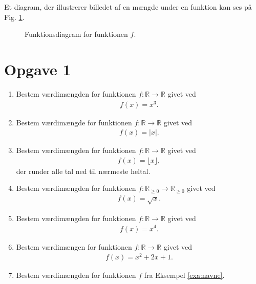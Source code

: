 Et diagram, der illustrerer billedet af en mængde under en funktion kan ses på Fig. \ref{fig:im}.
\begin{figure}[H]
	\centering
	\caption{Funktionsdiagram for funktionen $f$.}
	\label{fig:im}
\end{figure}


\section*{Opgave 1}
\begin{enumerate}[label=\roman*)]
\item Bestem værdimængden for funktionen $f:\mathbb{R} \to \mathbb{R}$ givet ved
\begin{align*}
f(x) = x^3.
\end{align*}
\item Bestem værdimængde for funktionen $f:\mathbb{R} \to \mathbb{R}$ givet ved
\begin{align*}
	f(x) = |x|.
\end{align*}
\item Bestem værdimængden for funktionen $f:\mathbb{R} \to \mathbb{R}$ givet ved
\begin{align*}
f(x) = \lfloor x \rfloor,
\end{align*}
der runder alle tal ned til nærmeste heltal. 
\item Bestem værdimængden for funktionen $f:\mathbb{R}_{\geq 0} \to \mathbb{R}_{\geq 0}$ givet ved
\begin{align*}
	f(x) = \sqrt{x}.
\end{align*}
\item Bestem værdimængden for funktionen $f:\mathbb{R} \to \mathbb{R}$ givet ved
\begin{align*}
	f(x) = x^4.
\end{align*}
\item Bestem værdimængen for funktionen $f: \mathbb{R} \to \mathbb{R}$ givet ved
\begin{align*}
	f(x) = x^2+2x+1.
\end{align*}
\item Bestem værdimængden for funktionen $f$ fra Eksempel \ref{exa:navne}.
\end{enumerate}
